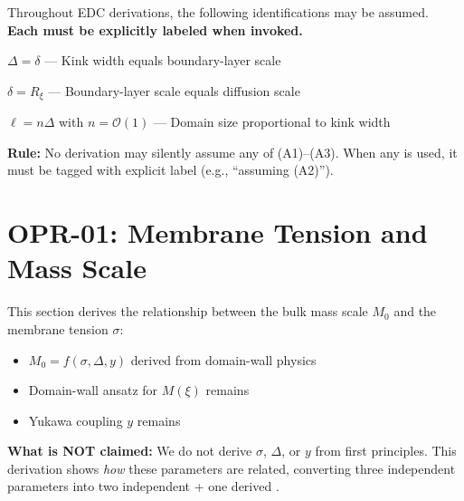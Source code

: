 Throughout EDC derivations, the following identifications may be assumed.
\textbf{Each must be explicitly labeled when invoked.}

\begin{tcolorbox}[colback=yellow!5!white, colframe=orange!50!black,
    title=\textbf{Scale Identification Assumptions}]
\begin{description}[leftmargin=3em, style=nextline]
    \item[\textbf{(A1)}] $\Delta = \delta$ --- Kink width equals boundary-layer scale
    \item[\textbf{(A2)}] $\delta = R_\xi$ --- Boundary-layer scale equals diffusion scale
    \item[\textbf{(A3)}] $\ell = n\Delta$ with $n = \mathcal{O}(1)$ --- Domain size proportional to kink width
\end{description}

\medskip
\textbf{Rule:} No derivation may silently assume any of (A1)--(A3). When any
is used, it must be tagged \tagP{} with explicit label (e.g., ``assuming (A2)'').
\end{tcolorbox}

\section{OPR-01: Membrane Tension and Mass Scale}
\label{sec:opr01}

\begin{tcolorbox}[edcGuardrail, title=\textbf{Epistemic Status: OPR-01}]
This section derives the relationship between the bulk mass scale $M_0$ and the
membrane tension $\sigma$:
\begin{itemize}[nosep]
    \item $M_0 = f(\sigma, \Delta, y)$ derived from domain-wall physics \tagDc{}
    \item Domain-wall ansatz for $M(\xi)$ remains \tagP{}
    \item Yukawa coupling $y$ remains \tagP{}
\end{itemize}
\textbf{What is NOT claimed:} We do not derive $\sigma$, $\Delta$, or $y$ from first
principles. This derivation shows \emph{how} these parameters are related, converting
three independent \tagP{} parameters into two independent + one derived \tagDc{}.
\end{tcolorbox}

